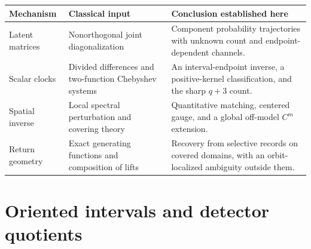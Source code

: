 \begin{center}
\small
\begin{tabular}{@{}p{}p{}p{}@{}}
\toprule
Mechanism & Classical input & Conclusion established here \\
\midrule
Latent matrices & Nonorthogonal joint diagonalization & Component
probability trajectories with unknown count and endpoint-dependent channels.\\
Scalar clocks & Divided differences and two-function Chebyshev systems &
An interval-endpoint inverse, a positive-kernel classification, and the sharp
$q+3$ count.\\
Spatial inverse & Local spectral perturbation and covering theory &
Quantitative matching, centered gauge, and a global off-model $C^m$ extension.\\
Return geometry & Exact generating functions and composition of lifts &
Recovery from selective records on covered domains, with an orbit-localized
ambiguity outside them.\\
\bottomrule
\end{tabular}
\end{center}

\section{Oriented intervals and detector quotients}
\label{sec:v83-interval}

